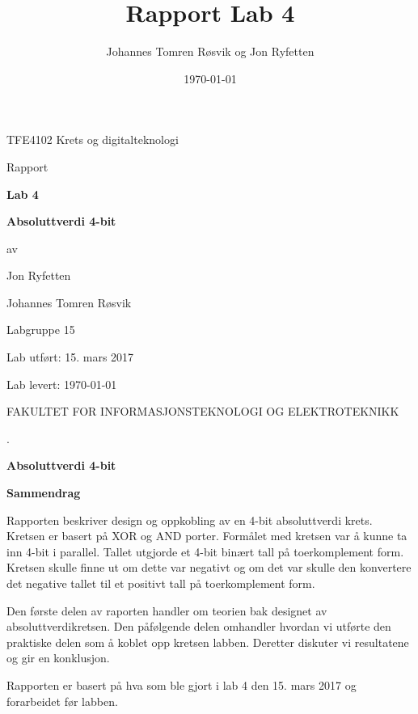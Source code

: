 \documentclass{article}
\title{Rapport Lab 4}
\author{Johannes Tomren Røsvik og Jon Ryfetten}
\date{\today}
\begin{document}


\begin{titlepage}
	\centering
	{\Large TFE4102 Krets og digitalteknologi \par}
	\vfill
	{\Large Rapport\par}
	\vspace{0.5cm}
	{\huge\bfseries Lab 4\par}
	{\huge\bfseries Absoluttverdi 4-bit\par}
	\vfill
	{av\par}
	{\Large Jon Ryfetten\par}
	{\Large Johannes Tomren Røsvik\par}
	\vspace{1cm}
	{\large Labgruppe 15 \par}
	\vfill
	{\large Lab utført: 15. mars 2017 \par}
	{\large Lab levert: \today \par}
	\vfill
	{FAKULTET FOR INFORMASJONSTEKNOLOGI OG ELEKTROTEKNIKK \par}
\end{titlepage}

\begin{titlepage}
	\centering
	{.\par}
	\vspace{7cm}
	{\huge\bfseries Absoluttverdi 4-bit \par}
	\vfill
\end{titlepage}

\newpage
{\large\bfseries Sammendrag}

Rapporten beskriver design og oppkobling av en 4-bit absoluttverdi krets. Kretsen er basert på XOR og AND porter. Formålet med kretsen var å kunne ta inn 4-bit i parallel. Tallet utgjorde et 4-bit binært tall på toerkomplement form. Kretsen skulle finne ut om dette var negativt og om det var skulle den konvertere det negative tallet til et positivt tall på toerkomplement form.

Den første delen av raporten handler om teorien bak designet av absoluttverdikretsen. Den påfølgende delen omhandler hvordan vi utførte den praktiske delen som å koblet opp kretsen labben. Deretter diskuter vi resultatene og gir en konklusjon.

Rapporten er basert på hva som ble gjort i lab 4 den 15. mars 2017 og forarbeidet før labben.
\end{document}
